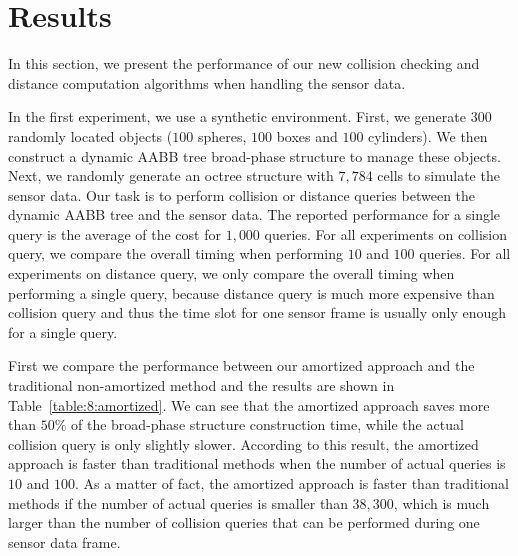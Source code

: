 \section{Results}
\label{sec:8:result}

In this section, we present the performance of our new collision checking
and distance computation algorithms when handling the sensor data.

In the first experiment, we use a synthetic \mbox{environment}. First, we
generate $300$ randomly located objects ($100$ spheres, $100$ boxes
and $100$ cylinders). We then construct a dynamic AABB tree broad-phase structure to manage these objects. Next, we randomly generate
an octree structure with $7,784$ cells to simulate the sensor
data. Our task is to perform collision or distance queries between the
dynamic AABB tree and the sensor data. The reported performance for a
single query is the average of the cost for $1,000$ queries. For all experiments on collision query, we compare the overall timing when performing $10$ and $100$ queries. For all experiments on distance query, we only compare the overall timing when performing a single query, because distance query is much more expensive than collision query and thus the time slot for one sensor frame is usually only enough for a single query.

First we compare the performance between our amortized approach and the
traditional non-amortized method and the results are shown in
Table~\ref{table:8:amortized}. We can see that the amortized approach
saves more than $50\%$ of the broad-phase structure construction time,
while the actual collision query is only slightly slower. According to
this result, the amortized approach is faster than traditional methods
when the number of actual queries is $10$ and $100$. As a matter of fact,
the amortized approach is faster than traditional methods
if the number of actual queries is smaller than $38,300$, which is much
larger than the number of collision queries that can be performed during
one sensor data frame.


